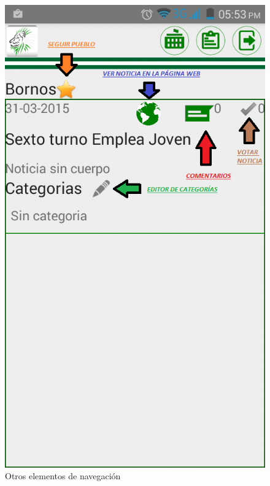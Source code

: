 \begin{figure}
\centering
\includegraphics[scale=0.5]{./android/imagenes/botones3.png}
\caption{Otros elementos de navegación}
\label{boton3}
\end{figure}

